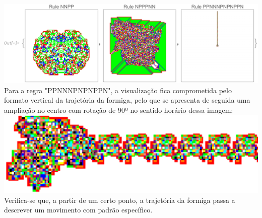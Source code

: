\documentclass[12pt,a4paper]{article}
\begin{document}
        \includegraphics[width=17cm]{3d_1.pdf} \\

        Para a regra "PPNNNPNPNPPN", a visualização fica comprometida pelo formato vertical da trajetória da formiga, pelo que se apresenta de seguida uma ampliação no centro com rotação de 90º no sentido horário dessa imagem: \\

        \includegraphics[width=17cm]{3d_2.png} \\

        Verifica-se que, a partir de um certo ponto, a trajetória da formiga passa a descrever um movimento com padrão específico.
\end{document}
